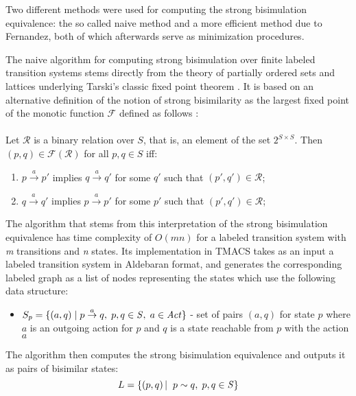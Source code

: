 Two different methods were used for computing the strong bisimulation equivalence: the so called naive method and a more efficient 
method due to Fernandez, both of which afterwards serve as minimization procedures.

The naive algorithm for computing strong bisimulation over finite labeled transition systems stems directly from the theory of partially ordered sets and lattices \cite{ReactiveSystems} underlying Tarski's classic fixed point theorem \cite{Tarsky}. It is based on an alternative definition of the notion of strong bisimilarity as the largest fixed point of the monotic function $\mathcal{F}$ defined as follows \cite{ReactiveSystems}:\\
\\
Let $\mathcal{R}$ is a binary relation over $\mathit{S}$, that is, an element of the set $2^{\mathit{S}\times \mathit{S}}$. Then $(p,q)\in \mathcal{F(R)}$ for all $p,q\in \mathit{S}$ iff:
	\begin{enumerate}
		\item $p\stackrel{a}{\rightarrow}p'$ implies $q\stackrel{a}{\rightarrow}q'$ for some $q'$ such that $(p',q')\in\mathcal{R}$;
		\item $q\stackrel{a}{\rightarrow}q'$ implies $p\stackrel{a}{\rightarrow}p'$ for some $p'$ such that $(p',q')\in\mathcal{R}$;
	\end{enumerate}

The algorithm that stems from this interpretation of the strong bisimulation equivalence has time complexity of $O(mn)$ for a labeled transition system with \emph{m} transitions and \emph{n} states. Its implementation in TMACS takes as an input a labeled transition system in Aldebaran format, and generates the corresponding labeled graph as a list of nodes representing the states which use the following data structure:
\begin{itemize}
	\item $S_p=\{(a, q)\hspace{1mm}|\hspace{1mm} p\stackrel{a}{\rightarrow}q, \hspace{1mm} p,q\in \mathit{S}, \hspace{1mm} a\in \mathit{Act}\}$ - set of pairs $(a, q)$ for state $p$ where $a$ is an outgoing action for $p$ and $q$ is a state
	reachable from $p$ with the action $a$
\end{itemize}
The algorithm then computes the strong bisimulation equivalence and outputs it as pairs of bisimilar states:
\begin{equation*}
	L = \left\{\left(p,q\right)|\hspace{1mm}\hspace{1mm} p\sim q, \hspace{1mm}p,q\in \mathit{S}\right\}
\end{equation*}

